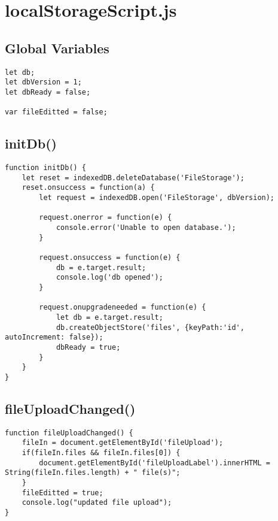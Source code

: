\documentclass[letterpaper]{article}
\begin{document}
\newpage

\section{localStorageScript.js}

\subsection{Global Variables}

\begin{lstlisting}[firstnumber=1]
let db;
let dbVersion = 1;
let dbReady = false;

var fileEditted = false;
\end{lstlisting}

\subsection{initDb()}

\begin{lstlisting}[firstnumber=7]
function initDb() {
    let reset = indexedDB.deleteDatabase('FileStorage');
    reset.onsuccess = function(a) {
        let request = indexedDB.open('FileStorage', dbVersion);

        request.onerror = function(e) {
            console.error('Unable to open database.');
        }

        request.onsuccess = function(e) {
            db = e.target.result;
            console.log('db opened');
        }

        request.onupgradeneeded = function(e) {
            let db = e.target.result;
            db.createObjectStore('files', {keyPath:'id', autoIncrement: false});
            dbReady = true;
        }
    }
}
\end{lstlisting}

\subsection{fileUploadChanged()}

\begin{lstlisting}[firstnumber=29]
function fileUploadChanged() {
    fileIn = document.getElementById('fileUpload');
    if(fileIn.files && fileIn.files[0]) {
        document.getElementById('fileUploadLabel').innerHTML = String(fileIn.files.length) + " file(s)";
    }
    fileEditted = true;
    console.log("updated file upload");
}
\end{lstlisting}
\end{document}
